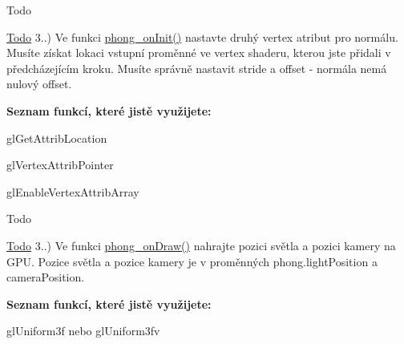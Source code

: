 \begin{DoxyRefDesc}{Todo}
\item[\hyperlink{todo__todo000007}{Todo}]3..) Ve funkci \hyperlink{student_8h_ac2adb2ba4e748239b9db4d037584d3cc}{phong\-\_\-on\-Init()} nastavte druhý vertex atribut pro normálu. Musíte získat lokaci vstupní proměnné ve vertex shaderu, kterou jste přidali v předcházejícím kroku. Musíte správně nastavit stride a offset -\/ normála nemá nulový offset.\par
 {\bfseries Seznam funkcí, které jistě využijete\-:}
\begin{DoxyItemize}
\item gl\-Get\-Attrib\-Location
\item gl\-Vertex\-Attrib\-Pointer
\item gl\-Enable\-Vertex\-Attrib\-Array 
\end{DoxyItemize}\end{DoxyRefDesc}


\begin{DoxyRefDesc}{Todo}
\item[\hyperlink{todo__todo000010}{Todo}]3..) Ve funkci \hyperlink{student_8h_a53ffbb1a271d285abdaf7a029192f47e}{phong\-\_\-on\-Draw()} nahrajte pozici světla a pozici kamery na G\-P\-U. Pozice světla a pozice kamery je v proměnných phong.\-light\-Position a camera\-Position.\par
 {\bfseries Seznam funkcí, které jistě využijete\-:}
\begin{DoxyItemize}
\item gl\-Uniform3f nebo gl\-Uniform3fv 
\end{DoxyItemize}\end{DoxyRefDesc}
